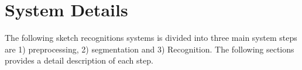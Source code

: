 \documentclass{article}%
\begin{document}
\section{System Details}
\label{Sysdisc}
The following sketch recognitions systems is divided into three main system steps are 1) preprocessing, 2) segmentation and 3) Recognition. The following sections provides a detail description of each step.
\end{document}
